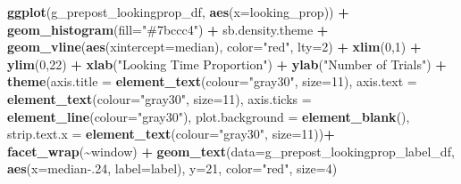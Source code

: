 \documentclass[
  doc,floatsintext]{apa6}
\newenvironment{Shaded}{\begin{snugshade}}{\end{snugshade}}
\newcommand{\AttributeTok}[1]{\textcolor[rgb]{0.13,0.29,0.53}{#1}}
\newcommand{\DecValTok}[1]{\textcolor[rgb]{0.00,0.00,0.81}{#1}}
\newcommand{\FloatTok}[1]{\textcolor[rgb]{0.00,0.00,0.81}{#1}}
\newcommand{\FunctionTok}[1]{\textcolor[rgb]{0.13,0.29,0.53}{\textbf{#1}}}
\newcommand{\NormalTok}[1]{#1}
\newcommand{\SpecialCharTok}[1]{\textcolor[rgb]{0.81,0.36,0.00}{\textbf{#1}}}
\newcommand{\StringTok}[1]{\textcolor[rgb]{0.31,0.60,0.02}{#1}}
\begin{document}
\begin{Shaded}
\begin{Highlighting}[]
\FunctionTok{ggplot}\NormalTok{(g\_prepost\_lookingprop\_df, }\FunctionTok{aes}\NormalTok{(}\AttributeTok{x=}\NormalTok{looking\_prop)) }\SpecialCharTok{+}
  \FunctionTok{geom\_histogram}\NormalTok{(}\AttributeTok{fill=}\StringTok{"\#7bccc4"}\NormalTok{) }\SpecialCharTok{+}
\NormalTok{  sb.density.theme }\SpecialCharTok{+}
  \FunctionTok{geom\_vline}\NormalTok{(}\FunctionTok{aes}\NormalTok{(}\AttributeTok{xintercept=}\NormalTok{median), }\AttributeTok{color=}\StringTok{"red"}\NormalTok{, }\AttributeTok{lty=}\DecValTok{2}\NormalTok{) }\SpecialCharTok{+}
  \FunctionTok{xlim}\NormalTok{(}\DecValTok{0}\NormalTok{,}\DecValTok{1}\NormalTok{) }\SpecialCharTok{+}
  \FunctionTok{ylim}\NormalTok{(}\DecValTok{0}\NormalTok{,}\DecValTok{22}\NormalTok{) }\SpecialCharTok{+}
  \FunctionTok{xlab}\NormalTok{(}\StringTok{"Looking Time Proportion"}\NormalTok{) }\SpecialCharTok{+}
  \FunctionTok{ylab}\NormalTok{(}\StringTok{"Number of Trials"}\NormalTok{) }\SpecialCharTok{+} 
  \FunctionTok{theme}\NormalTok{(}\AttributeTok{axis.title =} \FunctionTok{element\_text}\NormalTok{(}\AttributeTok{colour=}\StringTok{"gray30"}\NormalTok{, }\AttributeTok{size=}\DecValTok{11}\NormalTok{),}
        \AttributeTok{axis.text =} \FunctionTok{element\_text}\NormalTok{(}\AttributeTok{colour=}\StringTok{"gray30"}\NormalTok{, }\AttributeTok{size=}\DecValTok{11}\NormalTok{),}
        \AttributeTok{axis.ticks =} \FunctionTok{element\_line}\NormalTok{(}\AttributeTok{colour=}\StringTok{"gray30"}\NormalTok{),}
        \AttributeTok{plot.background =} \FunctionTok{element\_blank}\NormalTok{(),}
        \AttributeTok{strip.text.x =} \FunctionTok{element\_text}\NormalTok{(}\AttributeTok{colour=}\StringTok{"gray30"}\NormalTok{, }\AttributeTok{size=}\DecValTok{11}\NormalTok{))}\SpecialCharTok{+}
  \FunctionTok{facet\_wrap}\NormalTok{(}\SpecialCharTok{\textasciitilde{}}\NormalTok{window) }\SpecialCharTok{+}
  \FunctionTok{geom\_text}\NormalTok{(}\AttributeTok{data=}\NormalTok{g\_prepost\_lookingprop\_label\_df,}
            \FunctionTok{aes}\NormalTok{(}\AttributeTok{x=}\NormalTok{median}\FloatTok{{-}.24}\NormalTok{, }\AttributeTok{label=}\NormalTok{label), }\AttributeTok{y=}\DecValTok{21}\NormalTok{, }
            \AttributeTok{color=}\StringTok{"red"}\NormalTok{, }\AttributeTok{size=}\DecValTok{4}\NormalTok{)}
\end{Highlighting}
\end{Shaded}
\end{document}

